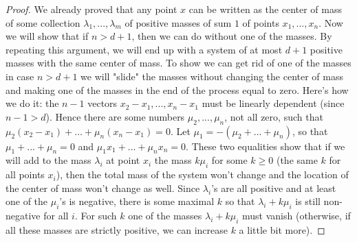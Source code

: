 \begin{proof}
We already proved that any point $x$ can be written as the center of mass of some collection $\lambda_1,...,\lambda_m$ of positive masses of sum $1$ of points $x_1,...,x_n$. Now we will show that if $n>d+1$, then we can do without one of the masses. By repeating this argument, we will end up with a system of at most $d+1$ positive masses with the same center of mass.
To show we can get rid of one of the masses in case $n>d+1$ we will "slide" the masses without changing the center of mass and making one of the masses in the end of the process equal to zero.
Here's how we do it: the $n-1$ vectors $x_2-x_1,...,x_n-x_1$ must be linearly dependent (since $n-1>d$). Hence there are some numbers $\mu_2,...,\mu_n$, not all zero, such that $\mu_2(x_2-x_1)+...+\mu_n(x_n-x_1)=0$. Let $\mu_1=-(\mu_2+...+\mu_n)$, so that $\mu_1+...+\mu_n=0$ and $\mu_1 x_1+...+\mu_n x_n=0$. These two equalities show that if we will add to the mass $\lambda_i$ at point $x_i$ the mass $k \mu_i$ for some $k\geq 0$ (the same $k$ for all points $x_i$), then the total mass of the system won't change and the location of the center of mass won't change as well. Since $\lambda_i$'s are all positive and at least one of the $\mu_i$'s is negative, there is some maximal $k$ so that $\lambda_i+k \mu_i$ is still non-negative for all $i$. For such $k$ one of the masses $\lambda_i+k \mu_i$ must vanish (otherwise, if all these masses are strictly positive, we can increase $k$ a little bit more).
\end{proof}
